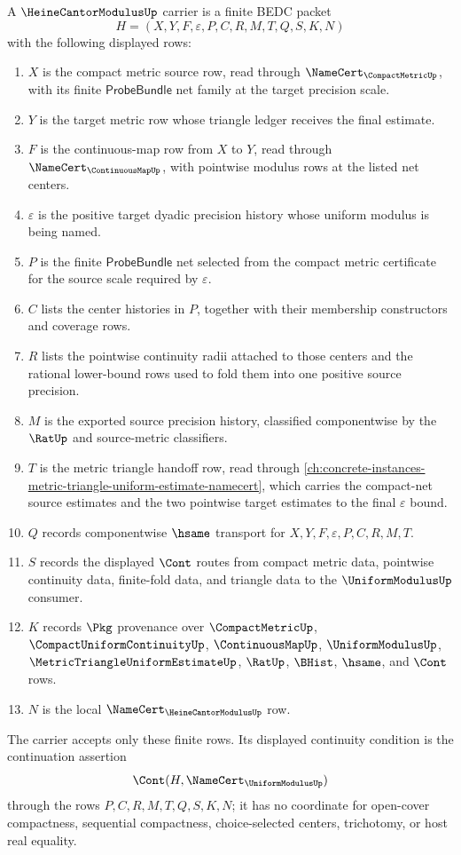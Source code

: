 \begin{definition}
\label{def:heine-cantor-modulus-carrier}
A $\HeineCantorModulusUp$ carrier is a finite BEDC packet
$$
H=(X,Y,F,\varepsilon,P,C,R,M,T,Q,S,K,N)
$$
with the following displayed rows:
\begin{enumerate}
\item $X$ is the compact metric source row, read through
$\NameCert_{\CompactMetricUp}$, with its finite $\mathsf{ProbeBundle}$ net
family at the target precision scale.
\item $Y$ is the target metric row whose triangle ledger receives the final
estimate.
\item $F$ is the continuous-map row from $X$ to $Y$, read through
$\NameCert_{\ContinuousMapUp}$, with pointwise modulus rows at the listed net
centers.
\item $\varepsilon$ is the positive target dyadic precision history whose
uniform modulus is being named.
\item $P$ is the finite $\mathsf{ProbeBundle}$ net selected from the compact
metric certificate for the source scale required by $\varepsilon$.
\item $C$ lists the center histories in $P$, together with their membership
constructors and coverage rows.
\item $R$ lists the pointwise continuity radii attached to those centers and
the rational lower-bound rows used to fold them into one positive source
precision.
\item $M$ is the exported source precision history, classified componentwise
by the $\RatUp$ and source-metric classifiers.
\item $T$ is the metric triangle handoff row, read through
\autoref{ch:concrete-instances-metric-triangle-uniform-estimate-namecert},
which carries the compact-net source estimates and the two pointwise target
estimates to the final $\varepsilon$ bound.
\item $Q$ records componentwise $\hsame$ transport for $X,Y,F,\varepsilon,P,C,R,M,T$.
\item $S$ records the displayed $\Cont$ routes from compact metric data,
pointwise continuity data, finite-fold data, and triangle data to the
$\UniformModulusUp$ consumer.
\item $K$ records $\Pkg$ provenance over $\CompactMetricUp$,
$\CompactUniformContinuityUp$, $\ContinuousMapUp$, $\UniformModulusUp$,
$\MetricTriangleUniformEstimateUp$, $\RatUp$, $\BHist$, $\hsame$, and
$\Cont$ rows.
\item $N$ is the local $\NameCert_{\HeineCantorModulusUp}$ row.
\end{enumerate}
The carrier accepts only these finite rows. Its displayed continuity condition
is the continuation assertion
$$
\Cont(H,\NameCert_{\UniformModulusUp})
$$
through the rows $P,C,R,M,T,Q,S,K,N$; it has no coordinate for open-cover
compactness, sequential compactness, choice-selected centers, trichotomy, or
host real equality.
\end{definition}

